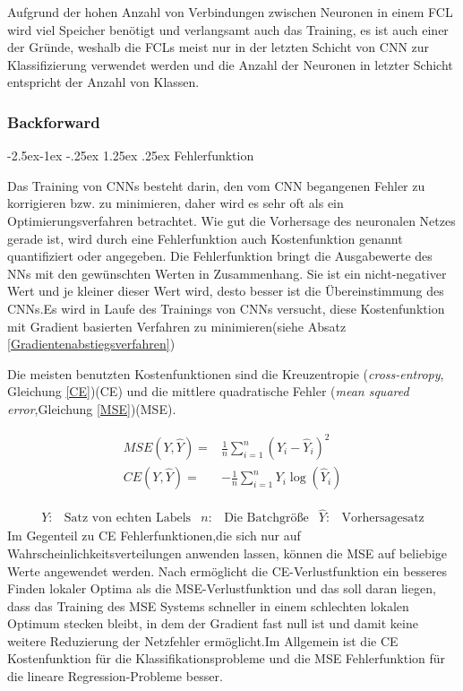 \documentclass[12pt,a4paper]{scrartcl}
\makeatletter
\numberwithin{equation}{section}
\renewcommand\paragraph{\@startsection{paragraph}{4}{\z@}%
	{-2.5ex\@plus -1ex \@minus -.25ex}%
	{1.25ex \@plus .25ex}%
	{\normalfont\normalsize\bfseries}}
\makeatother
\begin{document}
Aufgrund der hohen Anzahl von Verbindungen zwischen Neuronen in einem \ac{FCL} wird viel Speicher benötigt und verlangsamt auch das Training, es ist auch einer der Gründe, weshalb die \acsp{FCL} meist nur in der letzten Schicht von \ac{CNN} zur Klassifizierung verwendet werden und die Anzahl der Neuronen in letzter Schicht entspricht der Anzahl von Klassen.



\subsubsection{Backforward }

\paragraph{Fehlerfunktion}\label{Fehlerfunktion}

Das Training von \acsp{CNN} besteht darin, den vom \ac{CNN} begangenen Fehler zu korrigieren bzw. zu minimieren, daher wird es sehr oft als ein Optimierungsverfahren betrachtet.
Wie gut die Vorhersage des neuronalen Netzes gerade ist, wird durch eine Fehlerfunktion auch Kostenfunktion genannt quantifiziert oder angegeben.
Die Fehlerfunktion bringt die Ausgabewerte des \acsp{NN} mit den gewünschten Werten in Zusammenhang. Sie ist ein nicht-negativer Wert und je kleiner dieser Wert wird, desto besser ist die Übereinstimmung des \acsp{CNN}.Es wird in Laufe des Trainings von \acsp{CNN} versucht, diese Kostenfunktion mit Gradient basierten Verfahren zu minimieren(siehe Absatz \ref{Gradientenabstiegsverfahren})


Die meisten benutzten Kostenfunktionen sind die Kreuzentropie (\textit{cross-entropy}, Gleichung \ref{CE})(CE) und die mittlere quadratische Fehler (\textit{mean squared error},Gleichung \ref{MSE})(MSE). 

\begin{align}
\label{MSE}	
MSE(Y, \widehat{Y}) =&\frac{1}{n}\sum_{i = 1}^{n}(Y_i - \widehat{Y}_i)^2\\
\label{CE}
CE(Y, \widehat{Y}) =&-\frac{1}{n}\sum_{i = 1}^{n}Y_i\log(\widehat{Y}_i) 
\end{align}

\begin{align*}
Y:&\text{Satz von echten Labels} &  n: & \text{Die Batchgröße} & \widehat{Y}:&\text{Vorhersagesatz} 
\end{align*}
Im Gegenteil zu CE Fehlerfunktionen,die sich nur auf Wahrscheinlichkeitsverteilungen anwenden lassen, können die MSE auf beliebige Werte angewendet werden. Nach \cite[Pavel et al]{7} ermöglicht die CE-Verlustfunktion ein besseres Finden lokaler Optima als die MSE-Verlustfunktion und das soll daran liegen, dass das Training des MSE Systems schneller in einem schlechten lokalen Optimum stecken bleibt, in dem der Gradient fast null ist und damit keine weitere Reduzierung der Netzfehler ermöglicht.Im Allgemein ist die CE Kostenfunktion für die Klassifikationsprobleme und die MSE Fehlerfunktion für die lineare Regression-Probleme besser.
\end{document}
